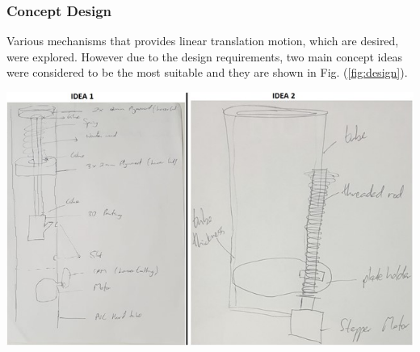\documentclass[11pt,landscape]{article}
\newenvironment{Figure}
  {\par\medskip\noindent\minipage{\linewidth}}
  {\endminipage\par\medskip}
\begin{document}
\begin{multicols}{2}
    \subsubsection{Concept Design}
    Various mechanisms that provides linear translation motion, which are
    desired, were explored. However due to the design requirements, two main
    concept ideas were considered to be the most suitable and they are shown in
    Fig. (\ref{fig:design}).
    
    \begin{Figure}
        \begin{center}
            \includegraphics[width=\textwidth]{Figure19.jpg}
            \label{fig:design}
        \end{center}
    \end{Figure}
    

\end{multicols}
\end{document}
